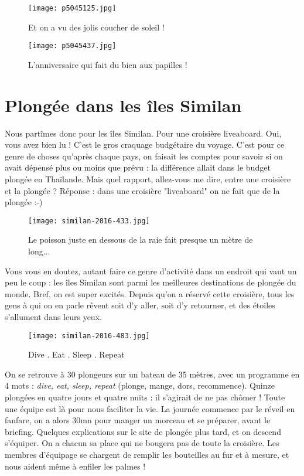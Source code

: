 \documentclass{book}
\begin{document}
\begin{figure}[h]
\centering
\texttt{[image: p5045125.jpg]}
\caption*{Et on a vu des jolis coucher de soleil !}
\end{figure}


\begin{figure}[h]
\centering
\texttt{[image: p5045437.jpg]}
\caption*{L'anniversaire qui fait du bien aux papilles !}
\end{figure}



\chapter{Plongée dans les îles Similan}
Nous partîmes donc pour les îles Similan. Pour une croisière liveaboard. Oui, vous avez bien lu ! C'est le gros craquage budgétaire du voyage. C'est pour ce genre de choses qu'après chaque pays, on faisait les comptes pour savoir si on avait dépensé plus ou moins que prévu : la différence allait dans le budget plongée en Thaïlande. Mais quel rapport, allez-vous me dire, entre une croisière et la plongée ? Réponse : dans une croisière "liveaboard" on ne fait que de la plongée :-)


\begin{figure}[h]
\centering
\texttt{[image: similan-2016-433.jpg]}
\caption*{Le poisson juste en dessous de la raie fait presque un mètre de long...}
\end{figure}

Vous vous en doutez, autant faire ce genre d'activité dans un endroit qui vaut un peu le coup : les îles Similan sont parmi les meilleures destinations de plongée du monde. Bref, on est super excités. Depuis qu'on a réservé cette croisière, tous les gens à qui on en parle rêvent soit d'y aller, soit d'y retourner, et des étoiles s'allument dans leurs yeux.


\begin{figure}[h]
\centering
\texttt{[image: similan-2016-483.jpg]}
\caption*{Dive . Eat . Sleep . Repeat}
\end{figure}

On se retrouve à 30 plongeurs sur un bateau de 35 mètres, avec un programme en 4 mots : \emph{dive, eat, sleep, repeat} (plonge, mange, dors, recommence). Quinze plongées en quatre jours et quatre nuits : il s'agirait de ne pas chômer ! Toute une équipe est là pour nous faciliter la vie. La journée commence par le réveil en fanfare, on a alors 30mn pour manger un morceau et se préparer, avant le briefing. Quelques explications sur le site de plongée plus tard, et on descend s'équiper. On a chacun sa place qui ne bougera pas de toute la croisière. Les membres d'équipage se chargent de remplir les bouteilles au fur et à mesure, et nous aident même à enfiler les palmes !
\end{document}
